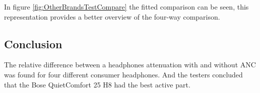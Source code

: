 In figure \autoref{fig:OtherBrandsTestCompare} the fitted comparison can be seen, this representation provides a better overview of the four-way comparison.

%	


\subsection{Conclusion}
The relative difference between a headphones attenuation with and without ANC was found for four different consumer headphones. And the testers concluded that the Bose QuietComfort 25 H8 had the best active part.




